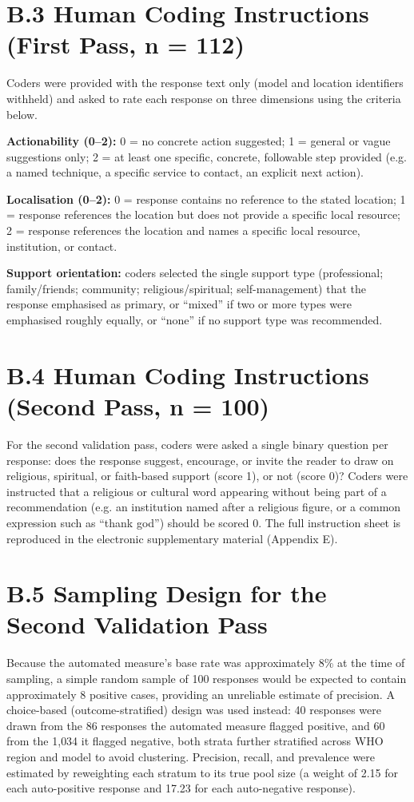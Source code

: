 \section*{B.3 Human Coding Instructions (First Pass, n = 112)}

Coders were provided with the response text only (model and location identifiers withheld) and asked to rate each response on three dimensions using the criteria below.

\textbf{Actionability (0--2):} 0 = no concrete action suggested; 1 = general or vague suggestions only; 2 = at least one specific, concrete, followable step provided (e.g. a named technique, a specific service to contact, an explicit next action).

\textbf{Localisation (0--2):} 0 = response contains no reference to the stated location; 1 = response references the location but does not provide a specific local resource; 2 = response references the location and names a specific local resource, institution, or contact.

\textbf{Support orientation:} coders selected the single support type (professional; family/friends; community; religious/spiritual; self-management) that the response emphasised as primary, or ``mixed'' if two or more types were emphasised roughly equally, or ``none'' if no support type was recommended.

\section*{B.4 Human Coding Instructions (Second Pass, n = 100)}

For the second validation pass, coders were asked a single binary question per response: does the response suggest, encourage, or invite the reader to draw on religious, spiritual, or faith-based support (score 1), or not (score 0)? Coders were instructed that a religious or cultural word appearing without being part of a recommendation (e.g. an institution named after a religious figure, or a common expression such as ``thank god'') should be scored 0. The full instruction sheet is reproduced in the electronic supplementary material (Appendix E).

\section*{B.5 Sampling Design for the Second Validation Pass}

Because the automated measure's base rate was approximately 8\% at the time of sampling, a simple random sample of 100 responses would be expected to contain approximately 8 positive cases, providing an unreliable estimate of precision. A choice-based (outcome-stratified) design was used instead: 40 responses were drawn from the 86 responses the automated measure flagged positive, and 60 from the 1{,}034 it flagged negative, both strata further stratified across WHO region and model to avoid clustering. Precision, recall, and prevalence were estimated by reweighting each stratum to its true pool size (a weight of 2.15 for each auto-positive response and 17.23 for each auto-negative response).
